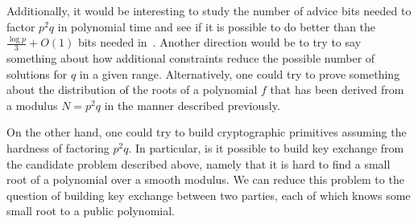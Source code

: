 \documentclass[letterpaper,twocolumn,10pt]{article}
\begin{document}
Additionally, it would be interesting to study the number of advice bits needed to factor $p^2 q$ in polynomial time and see if it is possible to do better than the $\frac{\log p}{3} + O(1)$ bits needed in~\cite{dan}. Another direction would be to try to say something about how additional constraints reduce the possible number of solutions for $q$ in a given range. Alternatively, one could try to prove something about the distribution of the roots of a polynomial $f$ that has been derived from a modulus $N = p^2 q$ in the manner described previously. 

On the other hand, one could try to build cryptographic primitives assuming the hardness of factoring $p^2 q$. In particular, is it possible to build key exchange from the candidate problem described above, namely that it is hard to find a small root of a polynomial over a smooth modulus. We can reduce this problem to the question of building key exchange between two parties, each of which knows some small root to a public polynomial. 

{\footnotesize 
}


\end{document}
